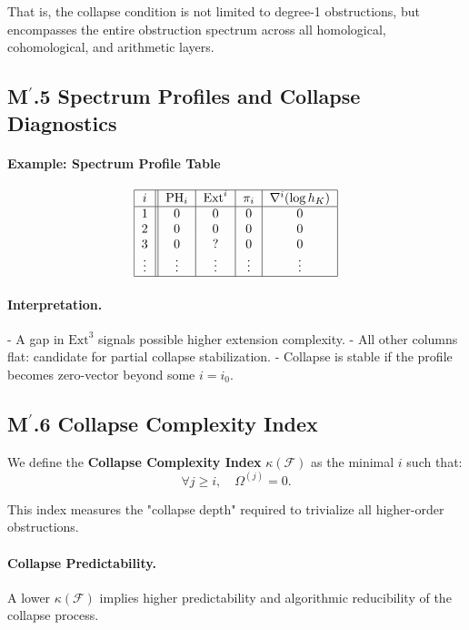 \documentclass[11pt]{article}
\begin{document}
That is, the collapse condition is not limited to degree-1 obstructions, but encompasses the entire obstruction spectrum across all homological, cohomological, and arithmetic layers.

\subsection*{M$^\prime$.5 Spectrum Profiles and Collapse Diagnostics}

\paragraph{Example: Spectrum Profile Table}

\[
\begin{tabular}{|c||c|c|c|c|}
\hline
$i$ & $\mathrm{PH}_i$ & $\mathrm{Ext}^i$ & $\pi_i$ & $\nabla^i (\log h_K)$ \\
\hline
1 & 0 & 0 & 0 & 0 \\
2 & 0 & 0 & 0 & 0 \\
3 & 0 & ? & 0 & 0 \\
\vdots & \vdots & \vdots & \vdots & \vdots \\
\hline
\end{tabular}
\]

\paragraph{Interpretation.}
- A gap in $\mathrm{Ext}^3$ signals possible higher extension complexity.
- All other columns flat: candidate for partial collapse stabilization.
- Collapse is stable if the profile becomes zero-vector beyond some $i = i_0$.

\subsection*{M$^\prime$.6 Collapse Complexity Index}

We define the \textbf{Collapse Complexity Index} $\kappa(\mathcal{F})$ as the minimal $i$ such that:
\[
\forall j \geq i, \quad \Omega^{(j)} = 0.
\]

This index measures the "collapse depth" required to trivialize all higher-order obstructions.

\paragraph{Collapse Predictability.}  
A lower $\kappa(\mathcal{F})$ implies higher predictability and algorithmic reducibility of the collapse process.
\end{document}
